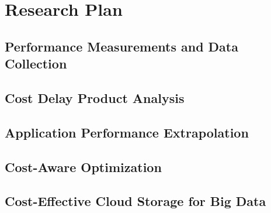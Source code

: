 
\section{Research Plan}
\label{sec:plan}

\subsection{Performance Measurements and Data Collection}


\subsection{Cost Delay Product Analysis}


\subsection{Application Performance Extrapolation}

\subsection{Cost-Aware Optimization}

\subsection{Cost-Effective Cloud Storage for Big Data}

